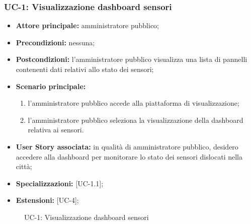 \documentclass[8pt]{article}
\begin{document}
\subsubsection*{UC-1: Visualizzazione dashboard sensori}
\begin{itemize}
    \item \textbf{Attore principale:} amministratore pubblico;
    \item \textbf{Precondizioni:} nessuna;
    \item \textbf{Postcondizioni:} l'amministratore pubblico visualizza una lista di pannelli
        contenenti dati relativi allo stato dei sensori;
    \item \textbf{Scenario principale:}
    \begin{enumerate}
    \item l’amministratore pubblico accede alla piattaforma di visualizzazione;
    \item l’amministratore pubblico seleziona la visualizzazione della dashboard relativa ai sensori.
    \end{enumerate}
    \item \textbf{User Story associata:} in qualità di amministratore pubblico, desidero accedere
        alla dashboard per monitorare lo stato dei sensori dislocati nella città;
    \item \textbf{Specializzazioni:} [UC-1.1];
    \item \textbf{Estensioni:} [UC-4];
\end{itemize}

\begin{figure}[ht!]
    \centering
    \caption{UC-1: Visualizzazione dashboard sensori}
    \label{fig:UC-1: Visualizzazione dashboard sensori}
\end{figure}
\end{document}
